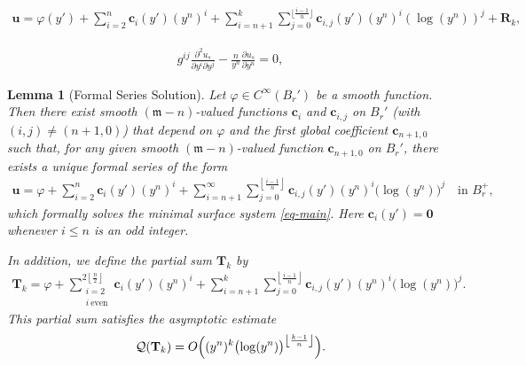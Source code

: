 \documentclass[10pt,a4paper]{amsart}
\newtheorem{lemma}{Lemma}
\newcommand{\fm}{\mathfrak{m}}
\renewcommand{\leq}{\leqslant}
\begin{document}
\begin{align}\label{eq-u-exp-0}
    \mathbf{u} = \varphi(y') +\sum_{i=2}^{n}\mathbf{c}_i(y')(y^n)^i +\sum_{i=n+1}^k\sum_{j=0}^{\lfloor \frac{i-1}{n}\rfloor} \mathbf{c}_{i,j}(y')(y^n)^i(\log(y^n))^j +\mathbf{R}_k,
\end{align}

\begin{align}\label{eq-main}
    g^{ij}\frac{\partial^2 u_s}{\partial y^i \partial y^j} - \frac{n}{y^{n}} \frac{\partial u_s}{\partial y^{n}} =0,
\end{align}

\begin{lemma}[Formal Series Solution]\label{lem-Form-Comp}
    Let $\varphi \in C^\infty(B_r')$ be a smooth function. Then there exist smooth $(\fm-n)$-valued functions $\mathbf{c}_i$ and $\mathbf{c}_{i,j}$ on $B_r'$ (with $(i,j)\neq (n+1,0)$) that depend on $\varphi$ and the first global coefficient $\mathbf{c}_{n+1,0}$ such that, for any given smooth $(\fm-n)$-valued function $\mathbf{c}_{n+1,0}$ on $B_r'$, there exists a unique formal series of the form
    \begin{align}\label{eq-expan}
        \mathbf{u} = \varphi +\sum_{i=2}^{n}\mathbf{c}_i(y')(y^n)^i +\sum_{i=n+1}^\infty \sum_{j=0}^{\left\lfloor \frac{i-1}{n}\right\rfloor} \mathbf{c}_{i,j}(y')(y^n)^i\bigl(\log (y^n)\bigr)^j \quad \text{in } B^+_r,
    \end{align}
    which formally solves the minimal surface system \eqref{eq-main}. Here  $\mathbf{c}_i(y')=\mathbf{0}$ whenever $i\leq n$ is an odd integer.

    In addition, we define the partial sum $\mathbf{T}_k$ by
    \begin{align}\label{eq-uk}
        \mathbf{T}_k = \varphi +\sum_{\substack{i=2 \\ i\ \text{even}}}^{2\left\lfloor \frac{n}{2}\right\rfloor}\mathbf{c}_i(y') (y^n)^i +\sum_{i=n+1}^k\sum_{j=0}^{\left\lfloor \frac{i-1}{n}\right\rfloor} \mathbf{c}_{i,j}(y') (y^n)^i\bigl(\log (y^n)\bigr)^j.
    \end{align}
    This partial sum satisfies the asymptotic estimate
    \begin{align}
        \mathcal{Q}(\mathbf{T}_k)=O\Bigl((y^n)^{k}\bigl(\log (y^n)\bigr)^{\left\lfloor \frac{k-1}{n}\right\rfloor}\Bigr).
    \end{align}
\end{lemma}
\end{document}
